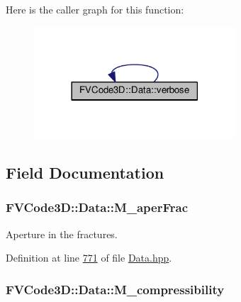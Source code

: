 Here is the caller graph for this function\+:
\nopagebreak
\begin{figure}[H]
\begin{center}
\leavevmode
\includegraphics[width=213pt]{classFVCode3D_1_1Data_a3bbbfecd1d18c9c81c151f65c2647020_icgraph}
\end{center}
\end{figure}




\subsection{Field Documentation}
\subsubsection[{\texorpdfstring{M\+\_\+aper\+Frac}{M_aperFrac}}]{ F\+V\+Code3\+D\+::\+Data\+::\+M\+\_\+aper\+Frac\hspace{0.3cm}{\ttfamily [protected]}}\hypertarget{classFVCode3D_1_1Data_abf85bba32b4b3bdc3a392f193d4a145d}{}\label{classFVCode3D_1_1Data_abf85bba32b4b3bdc3a392f193d4a145d}


Aperture in the fractures. 



Definition at line \hyperlink{Data_8hpp_source_l00771}{771} of file \hyperlink{Data_8hpp_source}{Data.\+hpp}.

\subsubsection[{\texorpdfstring{M\+\_\+compressibility}{M_compressibility}}]{ F\+V\+Code3\+D\+::\+Data\+::\+M\+\_\+compressibility\hspace{0.3cm}{\ttfamily [protected]}}\hypertarget{classFVCode3D_1_1Data_a8fc9be504e0a36500d75f1991d95caaa}{}\label{classFVCode3D_1_1Data_a8fc9be504e0a36500d75f1991d95caaa}


